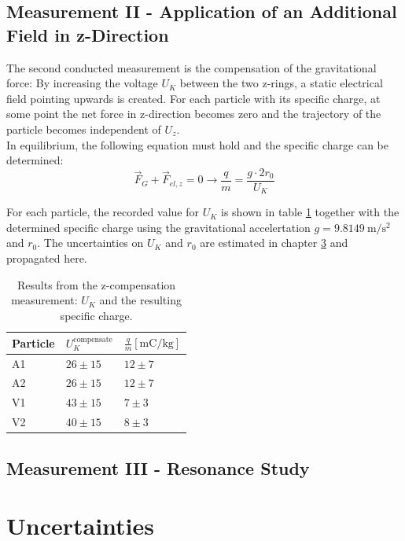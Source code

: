 \documentclass[
	paper=A4,
	parskip=full,
	chapterprefix=true,
	11pt,
	headings=normal,
	bibliography=totoc,
	listof=totoc,
	titlepage=on,
]{scrreprt}
\begin{document}
\section{Measurement II - Application of an Additional Field in z-Direction}
The second conducted measurement is the compensation of the gravitational force: By increasing the voltage $U_K$ between the two z-rings, a static electrical field pointing upwards is created. For each particle with its specific charge, at some point the net force in z-direction becomes zero and the trajectory of the particle becomes independent of $U_z$. \\
In equilibrium, the following equation must hold and the specific charge can be determined:
\begin{equation}
\vec{F}_G+\vec{F}_{el,z} = 0 \rightarrow \frac{q}{m} = \frac{g\cdot 2r_0}{U_K}
\end{equation}

For each particle, the recorded value for $U_K$ is shown in table \ref{tbl:Gcomp} together with the determined specific charge using the gravitational accelertation\cite{G_pres} $g=\SI{9.8149}{\meter\per\second^2}$ and $r_0$. The uncertainties on $U_K$ and $r_0$ are estimated in chapter \ref{ch:systematics} and propagated here.

\begin{table}[htbp]
	\centering
	\begin{tabular}{
			l
			l
			l
		}
		\toprule
		Particle & $U_K^{\textrm{compensate}}$ & $\frac{q}{m} [\si{\milli\coulomb\per\kilogram}]$  \\ 
		\midrule
		A1 & $26 \pm 15$ & $ 12 \pm 7 $\\
		A2 & $26 \pm 15$ & $ 12 \pm 7 $\\
		V1 & $43 \pm 15$ & $ 7 \pm 3  $\\
		V2 & $40 \pm 15$ & $ 8 \pm 3  $\\
		
		\bottomrule
	\end{tabular}
	\caption{Results from the z-compensation measurement: $U_K$ and the resulting specific charge.}
	\label{tbl:Gcomp}
\end{table}


\section{Measurement III - Resonance Study}

\chapter{Uncertainties}
\label{ch:systematics}
\end{document}

